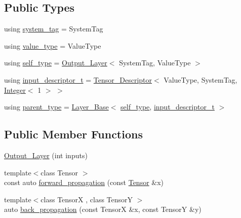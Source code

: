 \subsection*{Public Types}
\begin{DoxyCompactItemize}
\item 
using \hyperlink{structbc_1_1nn_1_1Output__Layer_ab5c2079fa05605177c4d9e1553fe1f59}{system\+\_\+tag} = System\+Tag
\item 
using \hyperlink{structbc_1_1nn_1_1Output__Layer_a042986d141dc7ddda55273c8b50320c4}{value\+\_\+type} = Value\+Type
\item 
using \hyperlink{structbc_1_1nn_1_1Output__Layer_ab795d02d54671c4235286a01e6bca7b9}{self\+\_\+type} = \hyperlink{structbc_1_1nn_1_1Output__Layer}{Output\+\_\+\+Layer}$<$ System\+Tag, Value\+Type $>$
\item 
using \hyperlink{structbc_1_1nn_1_1Output__Layer_adbc7c287b6f4b0dda68801784a6c6ca9}{input\+\_\+descriptor\+\_\+t} = \hyperlink{structbc_1_1nn_1_1Tensor__Descriptor}{Tensor\+\_\+\+Descriptor}$<$ Value\+Type, System\+Tag, \hyperlink{structbc_1_1traits_1_1Integer}{Integer}$<$ 1 $>$ $>$
\item 
using \hyperlink{structbc_1_1nn_1_1Output__Layer_ad625d63978c4e6b396d4ef52062515d0}{parent\+\_\+type} = \hyperlink{structbc_1_1nn_1_1Layer__Base}{Layer\+\_\+\+Base}$<$ \hyperlink{structbc_1_1nn_1_1Output__Layer_ab795d02d54671c4235286a01e6bca7b9}{self\+\_\+type}, \hyperlink{structbc_1_1nn_1_1Output__Layer_adbc7c287b6f4b0dda68801784a6c6ca9}{input\+\_\+descriptor\+\_\+t} $>$
\end{DoxyCompactItemize}
\subsection*{Public Member Functions}
\begin{DoxyCompactItemize}
\item 
\hyperlink{structbc_1_1nn_1_1Output__Layer_af2ea2ff4ed24a9ec365c80728b9eb0e0}{Output\+\_\+\+Layer} (int inputs)
\item 
{\footnotesize template$<$class Tensor $>$ }\\const auto \hyperlink{structbc_1_1nn_1_1Output__Layer_ab55ef92dd44d2319b84776a9edf9da9a}{forward\+\_\+propagation} (const \hyperlink{namespacebc_a659391e47ab612be3ba6c18cf9c89159}{Tensor} \&x)
\item 
{\footnotesize template$<$class TensorX , class TensorY $>$ }\\auto \hyperlink{structbc_1_1nn_1_1Output__Layer_ae17199c4928823b57fea1f9549dc9c9b}{back\+\_\+propagation} (const TensorX \&x, const TensorY \&y)
\end{DoxyCompactItemize}
